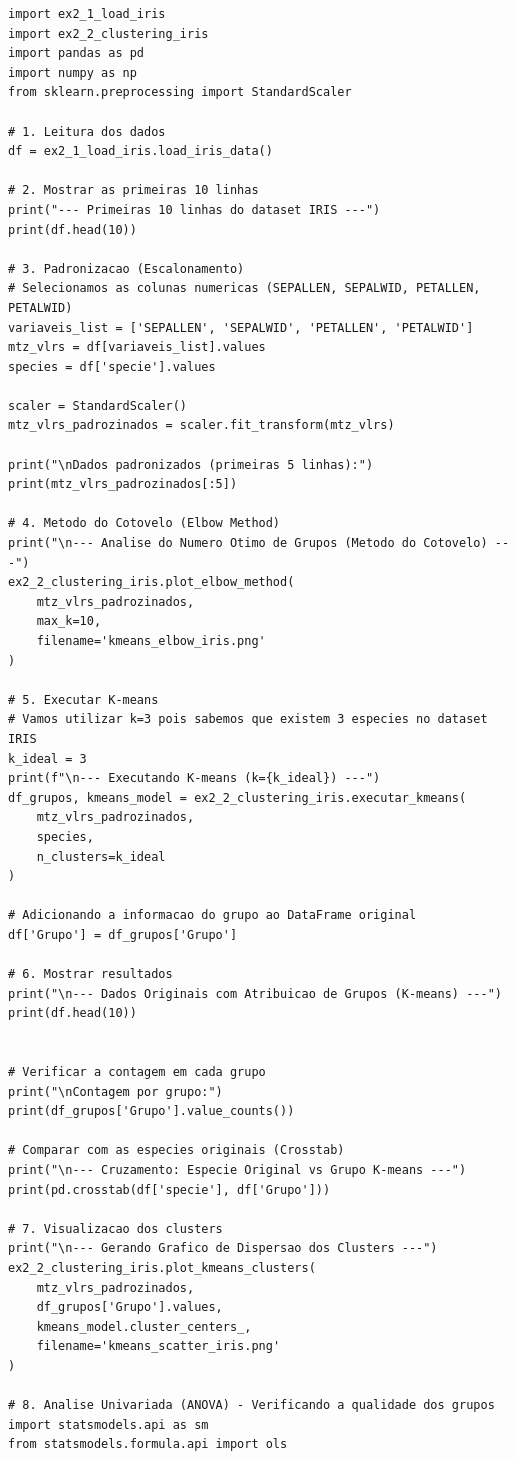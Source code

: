\documentclass[11pt]{article}
\begin{document}
\begin{verbatim}
import ex2_1_load_iris
import ex2_2_clustering_iris
import pandas as pd
import numpy as np
from sklearn.preprocessing import StandardScaler

# 1. Leitura dos dados
df = ex2_1_load_iris.load_iris_data()

# 2. Mostrar as primeiras 10 linhas
print("--- Primeiras 10 linhas do dataset IRIS ---")
print(df.head(10))

# 3. Padronizacao (Escalonamento)
# Selecionamos as colunas numericas (SEPALLEN, SEPALWID, PETALLEN, PETALWID)
variaveis_list = ['SEPALLEN', 'SEPALWID', 'PETALLEN', 'PETALWID']
mtz_vlrs = df[variaveis_list].values
species = df['specie'].values

scaler = StandardScaler()
mtz_vlrs_padrozinados = scaler.fit_transform(mtz_vlrs)

print("\nDados padronizados (primeiras 5 linhas):")
print(mtz_vlrs_padrozinados[:5])

# 4. Metodo do Cotovelo (Elbow Method)
print("\n--- Analise do Numero Otimo de Grupos (Metodo do Cotovelo) ---")
ex2_2_clustering_iris.plot_elbow_method(
    mtz_vlrs_padrozinados, 
    max_k=10, 
    filename='kmeans_elbow_iris.png'
)

# 5. Executar K-means
# Vamos utilizar k=3 pois sabemos que existem 3 especies no dataset IRIS
k_ideal = 3
print(f"\n--- Executando K-means (k={k_ideal}) ---")
df_grupos, kmeans_model = ex2_2_clustering_iris.executar_kmeans(
    mtz_vlrs_padrozinados, 
    species, 
    n_clusters=k_ideal
)

# Adicionando a informacao do grupo ao DataFrame original
df['Grupo'] = df_grupos['Grupo']

# 6. Mostrar resultados
print("\n--- Dados Originais com Atribuicao de Grupos (K-means) ---")
print(df.head(10))


# Verificar a contagem em cada grupo
print("\nContagem por grupo:")
print(df_grupos['Grupo'].value_counts())

# Comparar com as especies originais (Crosstab)
print("\n--- Cruzamento: Especie Original vs Grupo K-means ---")
print(pd.crosstab(df['specie'], df['Grupo']))

# 7. Visualizacao dos clusters
print("\n--- Gerando Grafico de Dispersao dos Clusters ---")
ex2_2_clustering_iris.plot_kmeans_clusters(
    mtz_vlrs_padrozinados, 
    df_grupos['Grupo'].values, 
    kmeans_model.cluster_centers_,
    filename='kmeans_scatter_iris.png'
)

# 8. Analise Univariada (ANOVA) - Verificando a qualidade dos grupos
import statsmodels.api as sm
from statsmodels.formula.api import ols


\end{verbatim}
\end{document}
